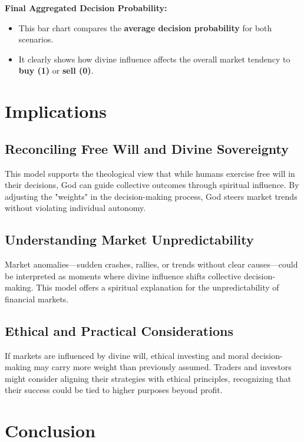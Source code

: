 \documentclass{article}
\newcommand{\bn}{\bigskip\noindent}
\begin{document}
\bn
 {\bf Final Aggregated Decision Probability:}  
 
 
\begin{itemize}
\item This bar chart compares the {\bf average decision probability} for both scenarios.  
\item It clearly shows how divine influence affects the overall market tendency to {\bf buy (1)} or {\bf sell (0)}.
\end{itemize}


\section{Implications}

\subsection{Reconciling Free Will and Divine Sovereignty}

This model supports the theological view that while humans exercise free will in their decisions, God can guide collective outcomes through spiritual influence. By adjusting the "weights" in the decision-making process, God steers market trends without violating individual autonomy.

\subsection{Understanding Market Unpredictability}

Market anomalies---sudden crashes, rallies, or trends without clear causes---could be interpreted as moments where divine influence shifts collective decision-making. This model offers a spiritual explanation for the unpredictability of financial markets.

\subsection{Ethical and Practical Considerations}

If markets are influenced by divine will, ethical investing and moral decision-making may carry more weight than previously assumed. Traders and investors might consider aligning their strategies with ethical principles, recognizing that their success could be tied to higher purposes beyond profit.



\section{Conclusion}
\end{document}
